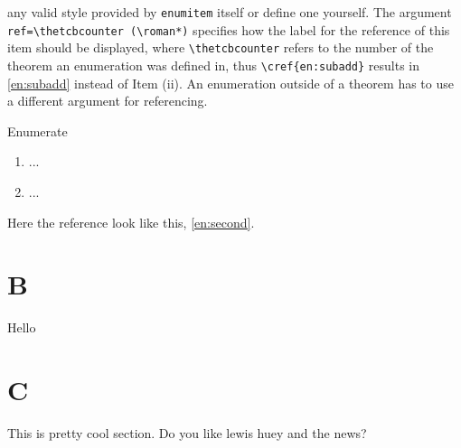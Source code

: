 any valid style provided by \texttt{enumitem} itself or define one yourself. 
The argument 
\lstinline[language={[LaTeX]TeX}]|ref=\thetcbcounter (\roman*)|
specifies how the label for 
the reference of this item should be displayed, where \lstinline[language={[LaTeX]TeX}]|\thetcbcounter| 
refers to the number of the theorem an enumeration was defined in, thus 
\lstinline[language={[LaTeX]TeX}]|\cref{en:subadd}| results in \cref{en:subadd} 
instead of \textcolor{\titlecolor}{Item (ii)}. An enumeration outside of a theorem has to use a different
argument for referencing.
\begin{lstbox}[]{Enumerate}
\begin{enumerate}[label=(K\theenumi), ref=MyEnum (K\theenumi)]
\item ... %
\item\label{en:second} ... %
\end{enumerate} 
\end{lstbox}
Here the reference look like this, \cref{en:second}.

\section{B}
Hello
\section{C}
This is pretty cool section.\newpage
Do you like lewis huey and the news?